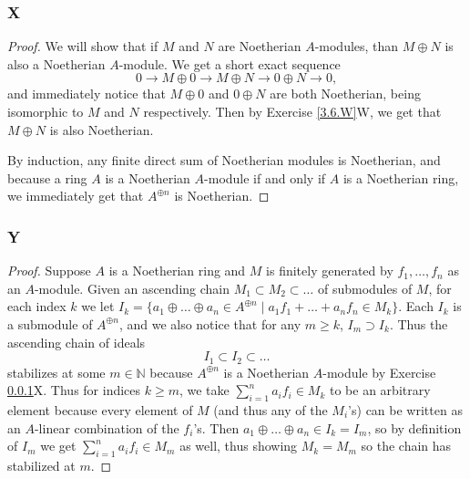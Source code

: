 \documentclass{article}
\newcommand{\N}{\mathbb{N}}
\begin{document}
\subsubsection{X}\label{3.6.X}
\begin{proof}
    We will show that if $M$ and $N$ are Noetherian $A$-modules, than $M\oplus N$ is also a Noetherian $A$-module. We get a short exact sequence
    \[
    0\to M\oplus 0\to M\oplus N \to 0\oplus N \to 0,
    \]
    and immediately notice that $M\oplus 0$ and $0\oplus N$ are both Noetherian, being isomorphic to $M$ and $N$ respectively. Then by Exercise \ref{3.6.W}W, we get that $M\oplus N$ is also Noetherian.

    By induction, any finite direct sum of Noetherian modules is Noetherian, and because a ring $A$ is a Noetherian $A$-module if and only if $A$ is a Noetherian ring, we immediately get that $A^{\oplus n}$ is Noetherian.
\end{proof}
\subsubsection{Y}\label{3.6.Y}
\begin{proof}
    Suppose $A$ is a Noetherian ring and $M$ is finitely generated by $f_1,\dots, f_n$ as an $A$-module. Given an ascending chain $M_1\subset M_2 \subset \dots$ of submodules of $M$, for each index $k$ we let $I_k = \{a_1\oplus \dots \oplus a_n \in A^{\oplus n} \mid a_1f_1 + \dots + a_n f_n \in M_k \}$. Each $I_k$ is a submodule of $A^{\oplus n}$, and we also notice that for any $m\ge k$, $I_m \supset I_k$. Thus the ascending chain of ideals
    \[
    I_1 \subset I_2 \subset \dots
    \]
    stabilizes at some $m\in \N$ because $A^{\oplus n}$ is a Noetherian $A$-module by Exercise \ref{3.6.X}X. Thus for indices $k\ge m$, we take $\sum_{i=1}^n a_i f_i \in M_k$ to be an arbitrary element because every element of $M$ (and thus any of the $M_i$'s) can be written as an $A$-linear combination of the $f_i$'s. Then $a_1\oplus \dots \oplus a_n \in I_k = I_m$, so by definition of $I_m$ we get $\sum_{i=1}^n a_i f_i \in M_m$ as well, thus showing $M_k= M_m$ so the chain has stabilized at $m$.
\end{proof}
\subsection{}
\end{document}
